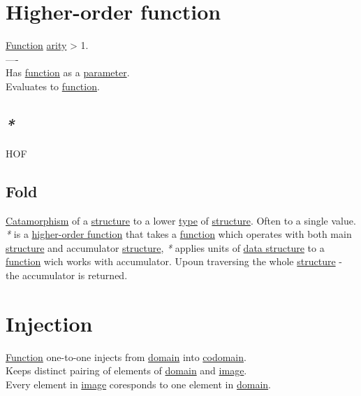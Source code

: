 \documentclass[a4paper,14pt,oneside]{book}
\begin{document}
\section{\label{org3c33015}Higher-order function}
\label{sec:org2ce47fa}
\hyperref[org9530a6b]{Function} \hyperref[org4746afc]{arity} > 1.\\

----\\

Has \hyperref[org9530a6b]{function} as a \hyperref[orgd362766]{parameter}.\\
Evaluates to \hyperref[org9530a6b]{function}.\\

\subsection{\emph{*}}
\label{sec:org053ca53}

\label{org3f91a36}HOF\\

\subsection{\label{org82124b7}Fold}
\label{sec:org22f7b31}
\hyperref[org9ca2b35]{Catamorphism} of a \hyperref[orgffe6855]{structure} to a lower \hyperref[org35b9249]{type} of \hyperref[orgffe6855]{structure}. Often to a single value.\\

\emph{*} is a \hyperref[org3c33015]{higher-order function} that takes a \hyperref[org9530a6b]{function} which operates with both main \hyperref[orgffe6855]{structure} and accumulator \hyperref[orgffe6855]{structure}, \emph{*} applies units of \hyperref[org8b4a18b]{data structure} to a \hyperref[org9530a6b]{function} wich works with accumulator. Upoun traversing the whole \hyperref[orgffe6855]{structure} - the accumulator is returned.\\

\section{\label{org42b89b2}Injection}
\label{sec:org3aaba9c}
\hyperref[org9530a6b]{Function} one-to-one injects from \hyperref[org0cadcd1]{domain} into \hyperref[orgaa1c608]{codomain}.\\

Keeps distinct pairing of elements of \hyperref[org0cadcd1]{domain} and \hyperref[orgc34e368]{image}.\\
Every element in \hyperref[orgc34e368]{image} coresponds to one element in \hyperref[org0cadcd1]{domain}.\\
\end{document}
